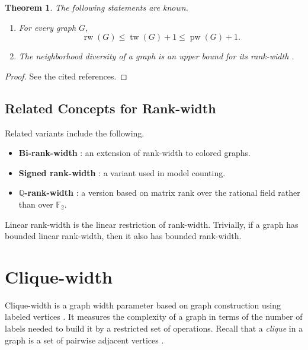 \documentclass[10pt]{book}
\newtheorem{theorem}{Theorem}[section]
\theoremstyle{definition}
\begin{document}
\begin{theorem}
The following statements are known.
\begin{enumerate}
    \item For every graph \(G\),
    \[
    \operatorname{rw}(G)\leq \operatorname{tw}(G)+1\leq \operatorname{pw}(G)+1.
    \]
    \cite{331}

    \item The neighborhood diversity of a graph is an upper bound for its rank-width \cite{346}.
\end{enumerate}
\end{theorem}

\begin{proof}
See the cited references.
\end{proof}

\subsection{Related Concepts for Rank-width}

Related variants include the following.

\begin{itemize}
    \item \textbf{Bi-rank-width} \cite{137}: an extension of rank-width to colored graphs.
    \item \textbf{Signed rank-width} \cite{156,231,232,233}: a variant used in model counting.
    \item \(\mathbb{Q}\)\textbf{-rank-width} \cite{365}: a version based on matrix rank over the rational field rather than over \(\mathbb{F}_2\).
\end{itemize}

Linear rank-width is the linear restriction of rank-width.  
Trivially, if a graph has bounded linear rank-width, then it also has bounded rank-width.

\section{Clique-width}

Clique-width is a graph width parameter based on graph construction using labeled vertices \cite{38}.  
It measures the complexity of a graph in terms of the number of labels needed to build it by a restricted set of operations.  
Recall that a \emph{clique} in a graph is a set of pairwise adjacent vertices \cite{szwarcfiter2003survey}.
\end{document}
